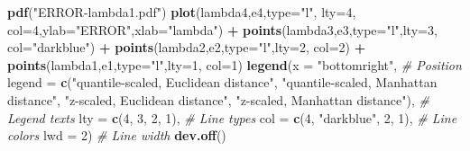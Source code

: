 \documentclass[12pt]{article}
\newenvironment{Shaded}{\begin{snugshade}}{\end{snugshade}}
\newcommand{\AttributeTok}[1]{\textcolor[rgb]{0.13,0.29,0.53}{#1}}
\newcommand{\CommentTok}[1]{\textcolor[rgb]{0.56,0.35,0.01}{\textit{#1}}}
\newcommand{\DecValTok}[1]{\textcolor[rgb]{0.00,0.00,0.81}{#1}}
\newcommand{\FunctionTok}[1]{\textcolor[rgb]{0.13,0.29,0.53}{\textbf{#1}}}
\newcommand{\NormalTok}[1]{#1}
\newcommand{\SpecialCharTok}[1]{\textcolor[rgb]{0.81,0.36,0.00}{\textbf{#1}}}
\newcommand{\StringTok}[1]{\textcolor[rgb]{0.31,0.60,0.02}{#1}}
\begin{document}
\begin{Shaded}
\begin{Highlighting}[]
\FunctionTok{pdf}\NormalTok{(}\StringTok{"ERROR{-}lambda1.pdf"}\NormalTok{)}
\FunctionTok{plot}\NormalTok{(lambda4,e4,}\AttributeTok{type=}\StringTok{"l"}\NormalTok{, }\AttributeTok{lty=}\DecValTok{4}\NormalTok{, }\AttributeTok{col=}\DecValTok{4}\NormalTok{,}\AttributeTok{ylab=}\StringTok{"ERROR"}\NormalTok{,}\AttributeTok{xlab=}\StringTok{"lambda"}\NormalTok{) }\SpecialCharTok{+}
    \FunctionTok{points}\NormalTok{(lambda3,e3,}\AttributeTok{type=}\StringTok{"l"}\NormalTok{,}\AttributeTok{lty=}\DecValTok{3}\NormalTok{, }\AttributeTok{col=}\StringTok{"darkblue"}\NormalTok{) }\SpecialCharTok{+}
    \FunctionTok{points}\NormalTok{(lambda2,e2,}\AttributeTok{type=}\StringTok{"l"}\NormalTok{,}\AttributeTok{lty=}\DecValTok{2}\NormalTok{, }\AttributeTok{col=}\DecValTok{2}\NormalTok{) }\SpecialCharTok{+}
    \FunctionTok{points}\NormalTok{(lambda1,e1,}\AttributeTok{type=}\StringTok{"l"}\NormalTok{,}\AttributeTok{lty=}\DecValTok{1}\NormalTok{, }\AttributeTok{col=}\DecValTok{1}\NormalTok{)}
\FunctionTok{legend}\NormalTok{(}\AttributeTok{x =} \StringTok{"bottomright"}\NormalTok{,          }\CommentTok{\# Position}
       \AttributeTok{legend =} \FunctionTok{c}\NormalTok{(}\StringTok{"quantile{-}scaled, Euclidean distance"}\NormalTok{, }\StringTok{"quantile{-}scaled, Manhattan distance"}\NormalTok{, }\StringTok{"z{-}scaled, Euclidean distance"}\NormalTok{, }\StringTok{"z{-}scaled, Manhattan distance"}\NormalTok{),  }\CommentTok{\# Legend texts}
       \AttributeTok{lty =} \FunctionTok{c}\NormalTok{(}\DecValTok{4}\NormalTok{, }\DecValTok{3}\NormalTok{, }\DecValTok{2}\NormalTok{, }\DecValTok{1}\NormalTok{),           }\CommentTok{\# Line types}
       \AttributeTok{col =} \FunctionTok{c}\NormalTok{(}\DecValTok{4}\NormalTok{, }\StringTok{"darkblue"}\NormalTok{, }\DecValTok{2}\NormalTok{, }\DecValTok{1}\NormalTok{),           }\CommentTok{\# Line colors}
       \AttributeTok{lwd =} \DecValTok{2}\NormalTok{)                 }\CommentTok{\# Line width}
\FunctionTok{dev.off}\NormalTok{()}
\end{Highlighting}
\end{Shaded}
\end{document}
